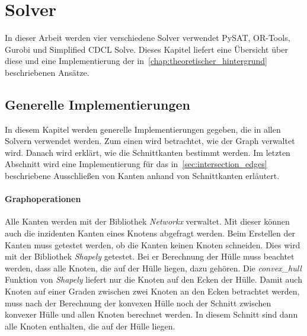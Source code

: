 \chapter{Solver}
In dieser Arbeit werden vier verschiedene Solver verwendet
PySAT, OR-Tools, Gurobi und Simplified CDCL Solve.
Dieses Kapitel liefert eine Übersicht über diese und eine Implementierung der in~\cref{chap:theoretischer_hintergrund} beschriebenen Ansätze.

\section{Generelle Implementierungen}
In diesem Kapitel werden generelle Implementierungen gegeben, die in allen Solvern verwendet werden.
Zum einen wird betrachtet, wie der Graph verwaltet wird.
Danach wird erklärt, wie die Schnittkanten bestimmt werden.
Im letzten Abschnitt wird eine Implementierung für das in~\cref{sec:intersection_edges} beschriebene Ausschließen von Kanten anhand von Schnittkanten erläutert.

\subsubsection{Graphoperationen}
Alle Kanten werden mit der Bibliothek \emph{Networkx} verwaltet.
Mit dieser können auch die inzidenten Kanten eines Knotens abgefragt werden.
Beim Erstellen der Kanten muss getestet werden, ob die Kanten keinen Knoten schneiden.
Dies wird mit der Bibliothek \emph{Shapely} getestet.
Bei er Berechnung der Hülle muss beachtet werden, dass alle Knoten, die auf der Hülle liegen, dazu gehören.
Die \emph{convex\_hull} Funktion von \emph{Shapely} liefert nur die Knoten auf den Ecken der Hülle. 
Damit auch Knoten auf einer Graden zwischen zwei Knoten an den Ecken betrachtet werden, muss nach der Berechnung der konvexen Hülle noch der Schnitt zwischen konvexer Hülle und allen Knoten berechnet werden.
In diesem Schnitt sind dann alle Knoten enthalten, die auf der Hülle liegen.

